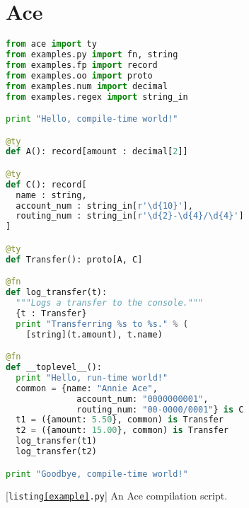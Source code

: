 \section{Ace}\label{ace}
\begin{codelisting}
\begin{lstlisting}[language=Python]
from ace import ty
from examples.py import fn, string
from examples.fp import record
from examples.oo import proto
from examples.num import decimal
from examples.regex import string_in

print "Hello, compile-time world!"

@ty
def A(): record[amount : decimal[2]]

@ty
def C(): record[
  name : string,
  account_num : string_in[r'\d{10}'],
  routing_num : string_in[r'\d{2}-\d{4}/\d{4}']
]

@ty
def Transfer(): proto[A, C]

@fn
def log_transfer(t):
  """Logs a transfer to the console."""
  {t : Transfer}
  print "Transferring %s to %s." % (
    [string](t.amount), t.name)

@fn
def __toplevel__():
  print "Hello, run-time world!"
  common = {name: "Annie Ace", 
              account_num: "0000000001", 
              routing_num: "00-0000/0001"} is C
  t1 = ({amount: 5.50}, common) is Transfer
  t2 = ({amount: 15.00}, common) is Transfer
  log_transfer(t1)
  log_transfer(t2)

print "Goodbye, compile-time world!"
\end{lstlisting}
\caption{[\texttt{listing\ref{example}.py}] An Ace compilation script.}
\label{example}
\end{codelisting}

